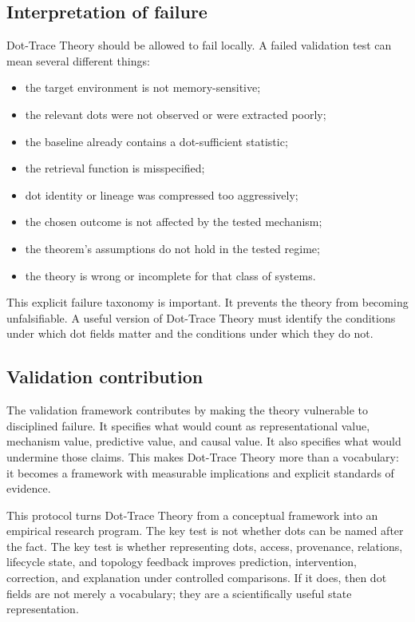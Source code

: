 \documentclass[11pt]{article}
\theoremstyle{remark}
\begin{document}
\subsection{Interpretation of failure}\label{interpretation-of-failure}

Dot-Trace Theory should be allowed to fail locally. A failed validation test can
mean several different things:

\begin{itemize}[leftmargin=*]
\item the target environment is not memory-sensitive;
\item the relevant dots were not observed or were extracted poorly;
\item the baseline already contains a dot-sufficient statistic;
\item the retrieval function is misspecified;
\item dot identity or lineage was compressed too aggressively;
\item the chosen outcome is not affected by the tested mechanism;
\item the theorem's assumptions do not hold in the tested regime;
\item the theory is wrong or incomplete for that class of systems.
\end{itemize}

This explicit failure taxonomy is important. It prevents the theory from
becoming unfalsifiable. A useful version of Dot-Trace Theory must identify the
conditions under which dot fields matter and the conditions under which they do
not.

\subsection{Validation contribution}\label{validation-contribution}

The validation framework contributes by making the theory vulnerable to disciplined failure. It specifies what would count as representational value, mechanism value, predictive value, and causal value. It also specifies what would undermine those claims. This makes Dot-Trace Theory more than a vocabulary: it becomes a framework with measurable implications and explicit standards of evidence.


This protocol turns Dot-Trace Theory from a conceptual framework into an
empirical research program. The key test is not whether dots can be named after
the fact. The key test is whether representing dots, access, provenance,
relations, lifecycle state, and topology feedback improves prediction,
intervention, correction, and explanation under controlled comparisons. If it
does, then dot fields are not merely a vocabulary; they are a scientifically
useful state representation.
\end{document}
